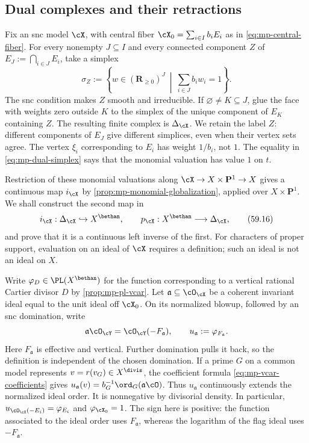 \subsection{Dual complexes and their retractions}
\label{subsec:mp-dual-retractions}

Fix an snc model $\cX$, with central fiber
$\cX_0=\sum_{i\in I}b_iE_i$ as in
\eqref{eq:mp-central-fiber}. For every nonempty $J\subseteq I$
and every connected component $Z$ of
$E_J:=\bigcap_{i\in J}E_i$, take a simplex
\[
 \sigma_Z:=\left\{w\in(\mathbf R_{\geq0})^J\ \middle|\
                     \sum_{i\in J}b_iw_i=1\right\}.
\tag{59.15}\label{eq:mp-dual-simplex}
\]
The snc condition makes $Z$ smooth and irreducible. If
$\varnothing\ne K\subseteq J$, glue the face with weights zero
outside $K$ to the simplex of the unique component of $E_K$
containing $Z$. The resulting finite complex is $\Delta_{\cX}$.
We retain the label $Z$: different components of $E_J$ give
different simplices, even when their vertex sets agree. The
vertex $\xi_i$ corresponding to $E_i$ has weight $1/b_i$, not
$1$. The equality in \eqref{eq:mp-dual-simplex} says that the
monomial valuation has value $1$ on $t$.

Restriction of these monomial valuations along
$\cX\to X\times\mathbf P^1\to X$ gives a continuous map
$i_{\cX}$ by \cref{prop:mp-monomial-globalization}, applied
over $X\times\mathbf P^1$. We shall construct the second map in
\[
 i_{\cX}:\Delta_{\cX}\hookrightarrow X^{\bethan},
 \qquad
 p_{\cX}:X^{\bethan}\longrightarrow\Delta_{\cX},
\tag{59.16}\label{eq:mp-inclusion-retraction}
\]
and prove that it is a continuous left inverse of the first.
For characters of proper support, evaluation on an ideal of
$\cX$ requires a definition; such an ideal is not an ideal on $X$.

Write $\varphi_D\in\PL(X^{\bethan})$ for the function
corresponding to a vertical rational Cartier divisor $D$ by
\cref{prop:mp-pl-vcar}. Let $\mathfrak a\subseteq\cO_{\cX}$
be a coherent invariant ideal equal to the unit ideal off
$\cX_0$. On its normalized blowup, followed by an snc
domination, write
\[
 \mathfrak a\cO_{\cY}=\cO_{\cY}(-F_{\mathfrak a}),
 \qquad u_{\mathfrak a}:=\varphi_{F_{\mathfrak a}}.
\]
Here $F_{\mathfrak a}$ is effective and vertical. Further
domination pulls it back, so the definition is independent
of the chosen domination. If a prime $G$ on a common model
represents $v=r(v_G)\in X^{\divis}$, the coefficient formula
\eqref{eq:mp-vcar-coefficients} gives
$u_{\mathfrak a}(v)=b_G^{-1}\ord_G(\mathfrak a\cO)$.
Thus $u_{\mathfrak a}$ continuously extends the normalized
ideal order. It is nonnegative by divisorial
density. In particular,
$u_{\cO_{\cX}(-E_i)}=\varphi_{E_i}$ and
$\varphi_{\cX_0}=1$. The sign here is positive: the function
associated to the ideal order uses $F_{\mathfrak a}$, whereas
the logarithm of the flag ideal uses $-F_{\mathfrak a}$.

